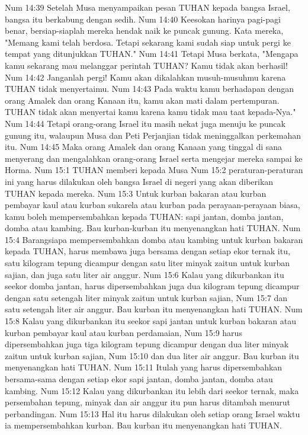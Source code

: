 Num 14:39  Setelah Musa menyampaikan pesan TUHAN kepada bangsa Israel, bangsa itu berkabung dengan sedih.
Num 14:40  Keesokan harinya pagi-pagi benar, bersiap-siaplah mereka hendak naik ke puncak gunung. Kata mereka, "Memang kami telah berdosa. Tetapi sekarang kami sudah siap untuk pergi ke tempat yang ditunjukkan TUHAN."
Num 14:41  Tetapi Musa berkata, "Mengapa kamu sekarang mau melanggar perintah TUHAN? Kamu tidak akan berhasil!
Num 14:42  Janganlah pergi! Kamu akan dikalahkan musuh-musuhmu karena TUHAN tidak menyertaimu.
Num 14:43  Pada waktu kamu berhadapan dengan orang Amalek dan orang Kanaan itu, kamu akan mati dalam pertempuran. TUHAN tidak akan menyertai kamu karena kamu tidak mau taat kepada-Nya."
Num 14:44  Tetapi orang-orang Israel itu masih nekat juga menuju ke puncak gunung itu, walaupun Musa dan Peti Perjanjian tidak meninggalkan perkemahan itu.
Num 14:45  Maka orang Amalek dan orang Kanaan yang tinggal di sana menyerang dan mengalahkan orang-orang Israel serta mengejar mereka sampai ke Horma.
Num 15:1  TUHAN memberi kepada Musa
Num 15:2  peraturan-peraturan ini yang harus dilakukan oleh bangsa Israel di negeri yang akan diberikan TUHAN kepada mereka.
Num 15:3  Untuk kurban bakaran atau kurban pembayar kaul atau kurban sukarela atau kurban pada perayaan-perayaan biasa, kamu boleh mempersembahkan kepada TUHAN: sapi jantan, domba jantan, domba atau kambing. Bau kurban-kurban itu menyenangkan hati TUHAN.
Num 15:4  Barangsiapa mempersembahkan domba atau kambing untuk kurban bakaran kepada TUHAN, harus membawa juga bersama dengan setiap ekor ternak itu, satu kilogram tepung dicampur dengan satu liter minyak zaitun untuk kurban sajian, dan juga satu liter air anggur.
Num 15:6  Kalau yang dikurbankan itu seekor domba jantan, harus dipersembahkan juga dua kilogram tepung dicampur dengan satu setengah liter minyak zaitun untuk kurban sajian,
Num 15:7  dan satu setengah liter air anggur. Bau kurban itu menyenangkan hati TUHAN.
Num 15:8  Kalau yang dikurbankan itu seekor sapi jantan untuk kurban bakaran atau kurban pembayar kaul atau kurban perdamaian,
Num 15:9  harus dipersembahkan juga tiga kilogram tepung dicampur dengan dua liter minyak zaitun untuk kurban sajian,
Num 15:10  dan dua liter air anggur. Bau kurban itu menyenangkan hati TUHAN.
Num 15:11  Itulah yang harus dipersembahkan bersama-sama dengan setiap ekor sapi jantan, domba jantan, domba atau kambing.
Num 15:12  Kalau yang dikurbankan itu lebih dari seekor ternak, maka persembahan tepung, minyak dan air anggur itu pun harus ditambah menurut perbandingan.
Num 15:13  Hal itu harus dilakukan oleh setiap orang Israel waktu ia mempersembahkan kurban. Bau kurban itu menyenangkan hati TUHAN.
